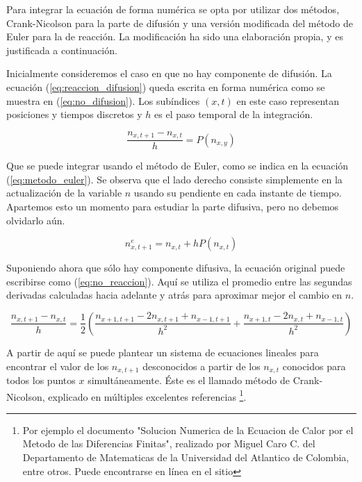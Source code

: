 \documentclass{article}
\begin{document}
Para integrar la ecuación de forma numérica se opta por utilizar dos métodos, Crank-Nicolson para la parte de difusión y una versión modificada del método de Euler para la de reacción. La modificación ha sido una elaboración propia, y es justificada a continuación.

Inicialmente consideremos el caso en que no hay componente de difusión. La ecuación (\ref{eq:reaccion_difusion}) queda escrita en forma numérica como se muestra en (\ref{eq:no_difusion}). Los subíndices $(x,t)$ en este caso representan posiciones y tiempos discretos y $h$ es el paso temporal de la integración.

\begin{equation}
  \frac{n_{x,t+1} - n_{x,t}}{h} = P(n_{x,y})
  \label{eq:no_difusion}
\end{equation} 

Que se puede integrar usando el método de Euler, como se indica en la ecuación (\ref{eq:metodo_euler}). Se observa que el lado derecho consiste simplemente en la actualización de la variable $n$ usando su pendiente en cada instante de tiempo. Apartemos esto un momento para estudiar la parte difusiva, pero no debemos olvidarlo aún.

\begin{equation}
  n_{x,t+1}^e = n_{x,t} + h P(n_{x,t})
  \label{eq:metodo_euler}
\end{equation}

Suponiendo ahora que sólo hay componente difusiva, la ecuación original puede escribirse como (\ref{eq:no_reaccion}). Aquí se utiliza el promedio entre las segundas derivadas calculadas hacia adelante y atrás para aproximar mejor el cambio en $n$.

\begin{equation}
  \frac{n_{x,t+1} - n_{x,t}}{h} = \frac{1}{2} \left( \frac{n_{x+1,t+1} - 2 n_{x,t+1} + n_{x-1,t+1} }{h^2} + \frac{n_{x+1,t} - 2 n_{x,t} + n_{x-1,t} }{h^2} \right)
  \label{eq:no_reaccion}
\end{equation}

A partir de aquí se puede plantear un sistema de ecuaciones lineales para encontrar el valor de los $n_{x,t+1}$ desconocidos a partir de los $n_{x,t}$ conocidos para todos los puntos $x$ simultáneamente. Éste es el llamado método de Crank-Nicolson, explicado en múltiples excelentes referencias \footnote{Por ejemplo el documento "Solucion Numerica de la Ecuacion de Calor por el Metodo de las Diferencias Finitas", realizado por Miguel Caro C. del Departamento de Matematicas de la Universidad del Atlantico de Colombia, entre otros. Puede encontrarse en línea en el sitio}.
\end{document}
